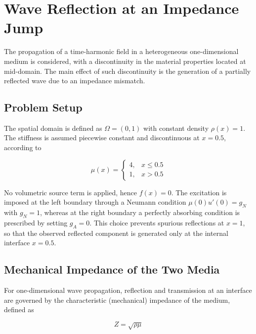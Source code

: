 
\section{Wave Reflection at an Impedance Jump}
\label{sc:13}

The propagation of a time-harmonic field in a heterogeneous one-dimensional medium is considered, with a discontinuity in the material properties located at mid-domain. The main effect of such discontinuity is the generation of a partially reflected wave due to an impedance mismatch.

\subsection{Problem Setup}

The spatial domain is defined as \(\Omega = (0,1)\) with constant density \(\rho(x) = 1\). The stiffness is assumed piecewise constant and discontinuous at \(x = 0.5\), according to

\begin{equation}
    \mu(x) =
    \begin{cases}
        4, & x \leq 0.5 \\
        1, & x > 0.5
    \end{cases}
    \label{eq:mu_jump}
\end{equation}

No volumetric source term is applied, hence \(f(x) = 0\). The excitation is imposed at the left boundary through a Neumann condition \(\mu(0)u'(0) = g_N\) with \(g_N = 1\), whereas at the right boundary a perfectly absorbing condition is prescribed by setting \(g_A = 0\). This choice prevents spurious reflections at \(x = 1\), so that the observed reflected component is generated only at the internal interface \(x = 0.5\).

\subsection{Mechanical Impedance of the Two Media}

For one-dimensional wave propagation, reflection and transmission at an interface are governed by the characteristic (mechanical) impedance of the medium, defined as

\begin{equation}
    Z = \sqrt{\rho\mu}
    \label{eq:impedance}
\end{equation}

